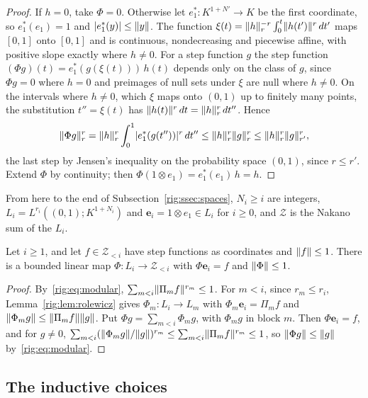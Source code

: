 \begin{proof}
If $h=0$, take $\Phi=0$. Otherwise let $e^*_1\colon K^{1+N'}\to K$ be the first coordinate, so $e^*_1(e_1)=1$ and
$\lvert e^*_1(y)\rvert\le\lVert y\rVert$. The function $\xi(t)=\lVert h\rVert_r^{-r}\int_0^t\lVert h(t')\rVert^r\,dt'$ maps $[0,1]$ onto $[0,1]$
and is continuous, nondecreasing and piecewise affine, with positive slope exactly where $h\ne0$. For a step function
$g$ the step function $(\Phi g)(t)=e^*_1(g(\xi(t)))\,h(t)$ depends only on the class of $g$, since $\Phi g=0$ where
$h=0$ and preimages of null sets under $\xi$ are null where $h\ne0$. On the intervals where $h\ne0$, which $\xi$ maps
onto $(0,1)$ up to finitely many points, the substitution $t''=\xi(t)$ has $\lVert h(t)\rVert^r\,dt=\lVert h\rVert_r^r\,dt''$. Hence
\[
 \lVert \Phi g\rVert_r^r=\lVert h\rVert_r^r\int_0^1\lvert e^*_1(g(t''))\rvert^r\,dt''\le\lVert h\rVert_r^r\lVert g\rVert_r^r\le\lVert h\rVert_r^r\lVert g\rVert_{r'}^r,
\]
the last step by Jensen's inequality on the probability space $(0,1)$, since $r\le r'$. Extend $\Phi$ by continuity;
then $\Phi(1\otimes e_1)=e^*_1(e_1)\,h=h$.
\end{proof}

From here to the end of Subsection~\ref{rig:ssec:spaces}, $N_i\ge i$ are integers, $L_i=L^{r_i}((0,1);K^{1+N_i})$ and
$\mathbf e_i=1\otimes e_1\in L_i$ for $i\ge0$, and $\mathcal Z$ is the Nakano sum of the $L_i$.

\begin{lemma}\label{rig:lem:onto-earlier}
Let $i\ge1$, and let $f\in\mathcal Z_{<i}$ have step functions as coordinates and $\lVert f\rVert\le1$. There is a bounded
linear map $\Phi\colon L_i\to\mathcal Z_{<i}$ with $\Phi\mathbf e_i=f$ and $\lVert \Phi\rVert\le1$.
\end{lemma}

\begin{proof}
By~\eqref{rig:eq:modular}, $\sum_{m<i}\lVert \Pi_mf\rVert^{r_m}\le1$. For $m<i$, since $r_m\le r_i$,
Lemma~\ref{rig:lem:rolewicz} gives $\Phi_m\colon L_i\to L_m$ with $\Phi_m\mathbf e_i=\Pi_mf$ and
$\lVert \Phi_mg\rVert\le\lVert \Pi_mf\rVert\lVert g\rVert$. Put $\Phi g=\sum_{m<i}\Phi_mg$, with $\Phi_mg$ in block $m$. Then
$\Phi\mathbf e_i=f$, and for $g\ne0$, $\sum_{m<i}(\lVert \Phi_mg\rVert/\lVert g\rVert)^{r_m}\le\sum_{m<i}\lVert \Pi_mf\rVert^{r_m}\le1$, so
$\lVert \Phi g\rVert\le\lVert g\rVert$ by~\eqref{rig:eq:modular}.
\end{proof}

\subsection{The inductive choices}\label{rig:ssec:choices}


